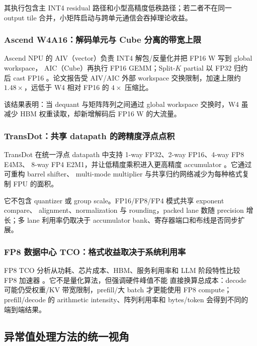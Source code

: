 其执行包含主 INT4 residual 路径和小型高精度低秩路径；若二者不在同一 output tile
合并，小矩阵启动与跨单元通信会吞掉理论收益。

\subsubsection{Ascend W4A16：解码单元与 Cube 分离的带宽上限}

Ascend NPU 的 AIV（vector）负责 INT4 解包/反量化并把 FP16 W 写到 global workspace，
AIC（Cube）再执行 FP16 GEMM；Split-$K$ partial 以 FP32 归约后 cast FP16
。论文报告受 AIV/AIC 外部 workspace
交换限制，加速上限约 $1.48\times$，远低于 W4 相对 FP16 的 $4\times$ 压缩比。

该结果表明：当 dequant 与矩阵阵列之间通过 global workspace 交换时，W4 虽减少
HBM 权重读取，却新增解码后 FP16 W 的大流量。

\subsubsection{TransDot：共享 datapath 的跨精度浮点点积}

TransDot 在统一浮点 datapath 中支持 1-way FP32、2-way FP16、4-way FP8 E4M3、
8-way FP4 E2M1，并让低精度乘积进入更高精度 accumulator
。它通过可重构 barrel shifter、
multi-mode multiplier 与共享归约网络减少为每种格式复制 FPU 的面积。

它不包含 quantizer 或 group scale。FP16/FP8/FP4 模式共享 exponent compare、
alignment、normalization 与 rounding，packed lane 数随 precision 增长；多 lane
利用率仍取决于 accumulator bank、寄存器端口和布线是否同步扩展。

\subsubsection{FP8 数据中心 TCO：格式收益取决于系统利用率}

FP8 TCO 分析从功耗、芯片成本、HBM、服务利用率和 LLM 阶段特性比较 FP8 加速器
。它不是量化算法，但强调硬件峰值不能
直接换算总成本：decode 可能仍受权重/KV 带宽限制，prefill/大 batch 才更能使用
FP8 compute；prefill/decode 的 arithmetic intensity、阵列利用率和 bytes/token
会得到不同的端到端结果。

\subsection{异常值处理方法的统一视角}

